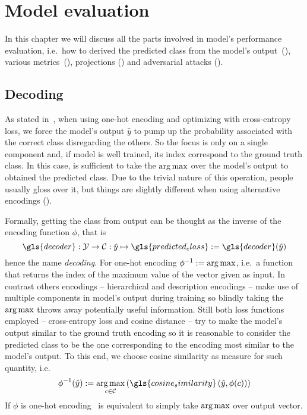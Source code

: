 \chapter{Model evaluation}
\label{ch:model-evaluation}

In this chapter we will discuss all the parts involved in model's performance evaluation, i.e.\ how to derived the predicted class from the model's output~(), various metrics~(), projections () and adversarial attacks ().

\section{Decoding}
\label{sec:decoding}

As stated in~, when using one-hot encoding and optimizing with cross-entropy loss, we force the model's output $\hat{y}$ to pump up the probability associated with the correct class disregarding the others. So the focus is only on a single component and, if model is well trained, its index correspond to the ground truth class. In this case, is sufficient to take the $\operatorname*{arg\,max}$ over the model's output to obtained the predicted class.
Due to the trivial nature of this operation, people usually gloss over it, but things are slightly different when using alternative encodings ().\medskip

Formally, getting the class from output can be thought as the inverse of the encoding function $\phi$, that is
\begin{equation}
  \gls{decoder} : \mathcal{Y} \to \mathcal{C}
  : \hat{y} \mapsto \gls{predicted_class} := \gls{decoder}(\hat{y})
  \label{eq:decoding}
\end{equation}
hence the name \emph{decoding}.
For one-hot encoding $\phi^{-1} := \operatorname*{arg\,max}$, i.e.\ a function that returns the index of the maximum value of the vector given as input. In contrast others encodings -- hierarchical and description encodings -- make use of multiple components in model's output during training so blindly taking the $\operatorname*{arg\,max}$ throws away potentially useful information. Still both loss functions employed -- cross-entropy loss and cosine distance -- try to make the model's output similar to the ground truth encoding so it is reasonable to consider the predicted class to be the one corresponding to the encoding most similar to the model's output.
To this end, we choose cosine similarity as measure for such quantity, i.e.\
\begin{equation}
  \phi^{-1}(\hat{y}) := \argmax_{c \in \mathcal{C}}
  \left( \gls{cosine_similarity} \left(\hat{y}, \phi(c) \right) \right)
  \label{eq:decoding-cos-sim}
\end{equation}
If $\phi$ is one-hot encoding~ is equivalent to simply take $\operatorname*{arg\,max}$ over output vector.

